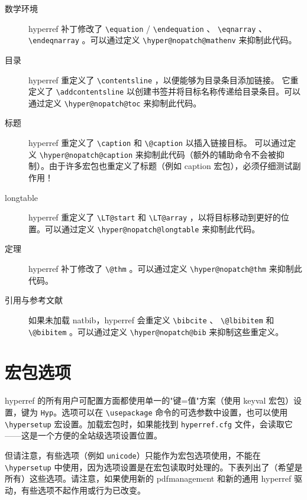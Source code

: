 \documentclass{article}
\newcommand*{\cs}[1]{%
  \texttt{\textbackslash #1}%
}
\newcommand*{\xpackage}[1]{\textsf{#1}}
\begin{document}
\begin{description}
\item[数学环境] \xpackage{hyperref} 补丁修改了 \cs{equation}/\cs{endequation}、\cs{eqnarray}、
    \cs{endeqnarray}。可以通过定义 \cs{hyper@nopatch@mathenv} 来抑制此代码。

\item[目录] \xpackage{hyperref} 重定义了 \cs{contentsline}，以便能够为目录条目添加链接。
它重定义了 \cs{addcontentsline} 以创建书签并将目标名称传递给目录条目。可以通过定义 \cs{hyper@nopatch@toc} 来抑制此代码。

\item[标题] \xpackage{hyperref} 重定义了 \cs{caption} 和 \cs{@caption} 以插入链接目标。
可以通过定义 \cs{hyper@nopatch@caption} 来抑制此代码（额外的辅助命令不会被抑制）。由于许多宏包也重定义了标题（例如 \xpackage{caption} 宏包），必须仔细测试副作用！

\item[longtable] \xpackage{hyperref} 重定义了 \cs{LT@start} 和 \cs{LT@array}，以将目标移动到更好的位置。可以通过定义 \cs{hyper@nopatch@longtable} 来抑制此代码。

\item[定理] \xpackage{hyperref} 补丁修改了 \cs{@thm}。可以通过定义 \cs{hyper@nopatch@thm} 来抑制此代码。

\item[引用与参考文献] 如果未加载 \xpackage{natbib}，\xpackage{hyperref} 会重定义 \cs{bibcite}、
\cs{@lbibitem} 和 \cs{@bibitem}。可以通过定义 \cs{hyper@nopatch@bib} 来抑制这些重定义。
\end{description}

\section{宏包选项}

\xpackage{hyperref} 的所有用户可配置方面都使用单一的"键=值"方案（使用 \xpackage{keyval} 宏包）设置，键为 \texttt{Hyp}。选项可以在 \cs{usepackage} 命令的可选参数中设置，也可以使用 \cs{hypersetup} 宏设置。加载宏包时，如果能找到 \texttt{hyperref.cfg} 文件，会读取它——这是一个方便的全站级选项设置位置。

但请注意，有些选项（例如 \texttt{unicode}）只能作为宏包选项使用，不能在 \verb|\hypersetup| 中使用，因为选项设置是在宏包读取时处理的。下表列出了（希望是所有）这些选项。请注意，如果使用新的 pdfmanagement 和新的通用 \xpackage{hyperref} 驱动，有些选项不起作用或行为已改变。
\end{document}
